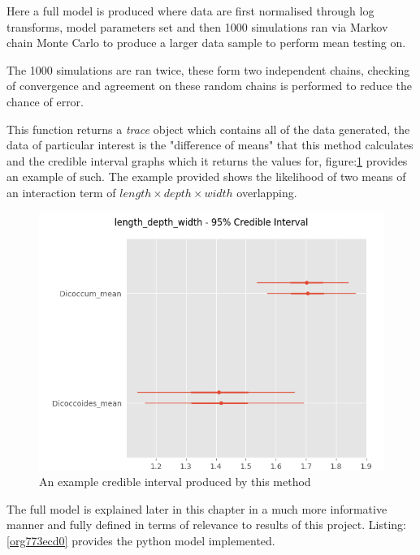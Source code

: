\documentclass[11pt]{report}
\begin{document}
Here a full model is produced where data are first normalised through log transforms, model parameters set and then 1000 simulations ran via Markov chain Monte Carlo to produce a larger data sample to perform mean testing on.

The 1000 simulations are ran twice, these form two independent chains, checking of convergence and agreement on these random chains is performed to reduce the chance of error.

This function returns a \emph{trace} object which contains all of the data generated, the data of particular interest is the "difference of means" that this method calculates and the credible interval graphs which it returns the values for, figure:\ref{fig:orgd68c0bb} provides an example of such. The example provided shows the likelihood of two means of an interaction term of
\(length \times  depth \times width\) overlapping.

\begin{figure}[htbp]
\centering
\includegraphics[width=15cm]{./images/ci.png}
\caption{\label{fig:orgd68c0bb}
An example credible interval produced by this method}
\end{figure}


The full model is explained later in this chapter in a much more informative manner and fully defined in terms of relevance to results of this project. Listing:\ref{org773ecd0} provides the python model implemented.
\end{document}
